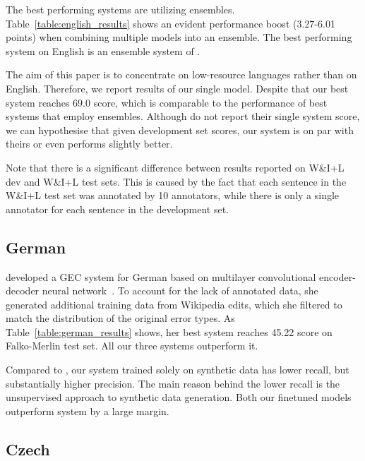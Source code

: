 \documentclass[11pt,a4paper]{article}
\begin{document}
The best performing systems are utilizing ensembles. Table~\ref{table:english_results} shows an evident performance boost (3.27-6.01 points) when combining multiple models into an ensemble. The best performing system on English is an ensemble system of .

The aim of this paper is to concentrate on low-resource languages rather than on English. Therefore, we report results of our single model. Despite that our best system reaches 69.0  score, which is comparable to the performance of best systems that employ ensembles. Although  do not report their single system score, we can hypothesise that given development set scores, our system is on par with theirs or even performs slightly better.

Note that there is a significant difference between results reported on W\&I+L dev and W\&I+L test sets. This is caused by the fact that each sentence in the W\&I+L test set was annotated by 10 annotators, while there is only a single annotator for each sentence in the development set. 

 
\subsection{German}

 developed a GEC system for German based on multilayer convolutional encoder-decoder neural network~\cite{chollampatt2018mlconv}. To account for the lack of annotated data, she generated additional training data from Wikipedia edits, which she filtered to match the distribution of the original error types. As Table~\ref{table:german_results} shows, her best system reaches 45.22  score on Falko-Merlin test set. All our three systems outperform it.

Compared to , our system trained solely on synthetic data has lower recall, but substantially higher precision. The main reason behind the lower recall is the unsupervised approach to synthetic data generation. Both our finetuned models outperform  system by a large margin.

\subsection{Czech}
\end{document}
